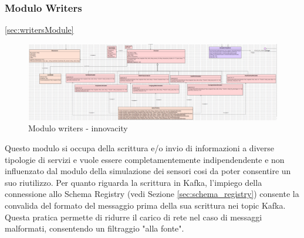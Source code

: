 \subsubsection{Modulo Writers} \ref*{sec:writersModule}
\begin{figure}[H]
    \centering
    \includegraphics[width=1\textwidth]{../Images/SpecificaTecnica/simulatoriSensori.PNG}
    \caption{Modulo writers - innovacity}
    \label{fig: fdsd}
\end{figure}

Questo modulo si occupa della scrittura e/o invio di informazioni a diverse tipologie di servizi e vuole essere completamentemente indipendendente e non influenzato dal modulo della simulazione dei sensori cosi da poter consentire un suo riutilizzo.
Per quanto riguarda la scrittura in Kafka, l'impiego della connessione allo Schema Registry (vedi Sezione \ref{sec:schema_registry}) consente la convalida del formato del messaggio prima della sua scrittura nei topic Kafka. Questa pratica permette di ridurre il carico di rete nel caso di messaggi malformati, consentendo un filtraggio "alla fonte".

